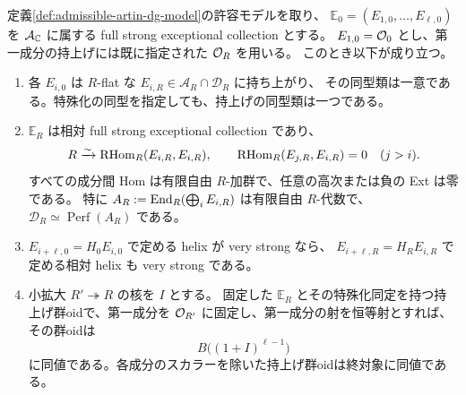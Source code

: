 \begin{theorem}[固定許容変形上の例外列の持上げ]
\label{thm:artin-exceptional-lift}
定義\ref{def:admissible-artin-dg-model}の許容モデルを取り、
$\mathbb E_0=(E_{1,0},\ldots,E_{\ell,0})$ を
$\mathcal A_{\mathbb C}$ に属する full strong exceptional collection とする。
$E_{1,0}=\mathcal O_0$ とし、第一成分の持上げには既に指定された $\mathcal O_R$ を用いる。
このとき以下が成り立つ。
\begin{enumerate}
\item 各 $E_{i,0}$ は $R$-flat な $E_{i,R}\in\mathcal A_R\cap\mathcal D_R$ に持ち上がり、
その同型類は一意である。特殊化の同型を指定しても、持上げの同型類は一つである。
\item $\mathbb E_R$ は相対 full strong exceptional collection であり、
\[
 R\xrightarrow{\sim}\operatorname{RHom}_R(E_{i,R},E_{i,R}),\qquad
 \operatorname{RHom}_R(E_{j,R},E_{i,R})=0\quad(j>i).
\]
すべての成分間 Hom は有限自由 $R$-加群で、任意の高次または負の Ext は零である。
特に $A_R:=\operatorname{End}_R(\bigoplus_iE_{i,R})$ は有限自由 $R$-代数で、
$\mathcal D_R\simeq\operatorname{Perf}(A_R)$ である。
\item $E_{i+\ell,0}=H_0E_{i,0}$ で定める helix が very strong なら、
$E_{i+\ell,R}=H_RE_{i,R}$ で定める相対 helix も very strong である。
\item 小拡大 $R'\twoheadrightarrow R$ の核を $I$ とする。
固定した $\mathbb E_R$ とその特殊化同定を持つ持上げ群oidで、第一成分を
$\mathcal O_{R'}$ に固定し、第一成分の射を恒等射とすれば、その群oidは
\begin{equation}\label{eq:artin-raw-lift-gerbe}
 B\bigl((1+I)^{\ell-1}\bigr)
\end{equation}
に同値である。各成分のスカラーを除いた持上げ群oidは終対象に同値である。
\end{enumerate}
\end{theorem}
